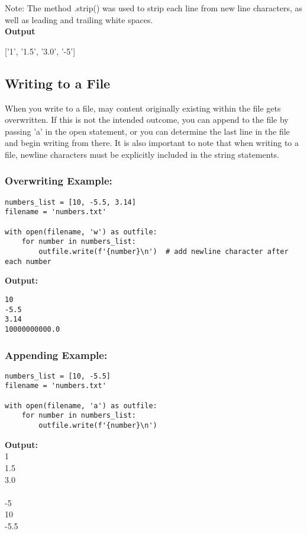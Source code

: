 Note: The method .strip() was used to strip each line from new line characters, as well as leading and trailing white spaces.
\\[0.35cm]
\textbf{Output}
\begin{center}
    ['1', '1.5', '3.0', '-5']
\end{center}



\subsection{Writing to a File}
When you write to a file, may content originally existing within the file gets overwritten. If this is not the intended outcome, you can append to the file by passing 'a' in the open statement, or you can determine the last line in the file and begin writing from there. It is also important to note that when writing to a file, newline characters must be explicitly included in the string statements.

\subsubsection{Overwriting Example:}
\begin{verbatim}
numbers_list = [10, -5.5, 3.14]
filename = 'numbers.txt'

with open(filename, 'w') as outfile:
    for number in numbers_list:
        outfile.write(f'{number}\n')  # add newline character after each number
\end{verbatim}

\textbf{Output:}
\begin{verbatim}
10
-5.5
3.14
10000000000.0
\end{verbatim}

\subsubsection{Appending Example:}
\begin{verbatim}
numbers_list = [10, -5.5]
filename = 'numbers.txt'

with open(filename, 'a') as outfile:
    for number in numbers_list:
        outfile.write(f'{number}\n')
\end{verbatim}

\textbf{Output:}\\
1\\
1.5\\
3.0\\
\\[0.2cm]
-5\\
10\\
-5.5

